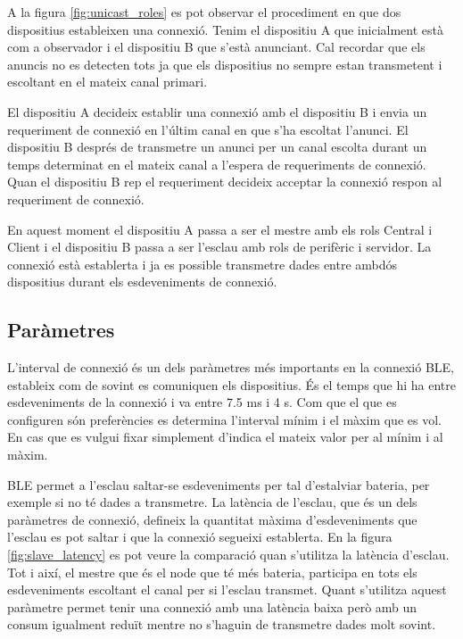 A la figura \ref{fig:unicast_roles} es pot observar el procediment en que dos dispositius estableixen una connexió.
Tenim el dispositiu A que inicialment està com a observador i el dispositiu B que s'està anunciant.
Cal recordar que els anuncis no es detecten tots ja que els dispositius no sempre estan transmetent i escoltant en el mateix canal primari.

El dispositiu A decideix establir una connexió amb el dispositiu B i envia un requeriment de connexió en l'últim canal en que s'ha escoltat l'anunci.
El dispositiu B després de transmetre un anunci per un canal escolta durant un temps determinat en el mateix canal a l'espera de requeriments de connexió.
Quan el dispositiu B rep el requeriment decideix acceptar la connexió respon al requeriment de connexió.

En aquest moment el dispositiu A passa a ser el mestre amb els rols Central i Client i el dispositiu B passa a ser l'esclau amb rols de perifèric i servidor.
La connexió està establerta i ja es possible transmetre dades entre ambdós dispositius durant els esdeveniments de connexió. 


\subsection{Paràmetres}
\label{sec:params}
L'interval de connexió és un dels paràmetres més importants en la connexió BLE, estableix com de sovint es comuniquen els dispositius.
És el temps que hi ha entre esdeveniments de la connexió i va entre 7.5 ms i 4 s.
Com que el que es configuren són preferències es determina l'interval mínim i el màxim que es vol.
En cas que es vulgui fixar simplement d'indica el mateix valor per al mínim i al màxim.

BLE permet a l'esclau saltar-se esdeveniments per tal d'estalviar bateria, per exemple si no té dades a transmetre.
La latència de l'esclau, que és un dels paràmetres de connexió, defineix la quantitat màxima d'esdeveniments que l'esclau es pot saltar i que la connexió segueixi establerta.
En la figura \ref{fig:slave_latency} es pot veure la comparació quan s'utilitza la latència d'esclau.
Tot i així, el mestre que és el node que té més bateria, participa en tots els esdeveniments escoltant el canal per si l'esclau transmet.
Quant s'utilitza aquest paràmetre permet tenir una connexió amb una latència baixa però amb un consum igualment reduït mentre no s'haguin de transmetre dades molt sovint.

